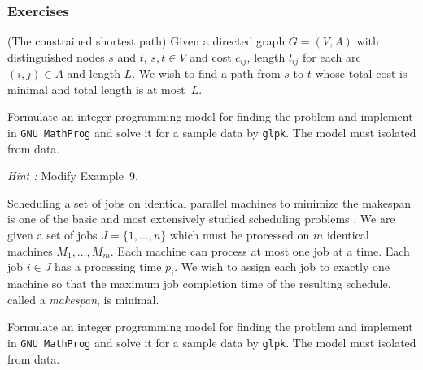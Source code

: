 \documentclass[landscape]{beamer}
\begin{document}
\begin{frame}[fragile]
  \frametitle{Exercises}
\begin{footnotesize}
 (The constrained shortest path)
Given a directed graph $G=(V,A)$ with distinguished
nodes $s$ and $t$, $s,t\in V$ and 
 cost $c_{ij}$, length $l_{ij}$ for each arc $(i,j)\in A$ and
 length $L$. We wish to find a path from $s$ to $t$ whose total cost is minimal
 and total length is at most~$L$.
 
 Formulate an  integer programming model for finding 
the problem
and implement in \verb=GNU MathProg= 
and solve it for a sample data by 
\verb=glpk=. 
The model must isolated
from data. 

\emph{Hint :} Modify Example~9.

Scheduling a set of jobs on identical parallel machines to minimize the makespan is one of the basic and most extensively studied scheduling problems
. We are given a set of jobs $J=\{1,\dots,n\}$ which must be processed on $m$ identical machines $M_1,\dots,M_m$. Each machine can process at most one job at a time. Each job $i\in J$ has a processing time $p_i$. We wish to assign each job to exactly one machine so that the maximum job completion time of the resulting schedule, called a \emph{makespan}, is minimal. 

Formulate an  integer programming model for finding 
the problem
and implement in \verb=GNU MathProg= 
and solve it for a sample data by 
\verb=glpk=. 
The model must isolated
from data. 


\end{footnotesize}  
\end{frame}
\end{document}
